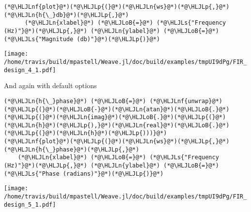 \documentclass[12pt,a4paper]{article}
\newcommand{\HLJLn}[1]{#1}
\newcommand{\HLJLnf}[1]{\textcolor[RGB]{66,102,213}{#1}}
\newcommand{\HLJLs}[1]{\textcolor[RGB]{201,61,57}{#1}}
\newcommand{\HLJLoB}[1]{\textcolor[RGB]{102,102,102}{\textbf{#1}}}
\newcommand{\HLJLp}[1]{#1}
\begin{document}
\begin{lstlisting}
(*@\HLJLnf{plot}@*)(*@\HLJLp{(}@*)(*@\HLJLn{ws}@*)(*@\HLJLp{,}@*) (*@\HLJLn{h{\_}db}@*)(*@\HLJLp{,}@*)
      (*@\HLJLn{xlabel}@*) (*@\HLJLoB{=}@*) (*@\HLJLs{"Frequency (Hz)"}@*)(*@\HLJLp{,}@*) (*@\HLJLn{ylabel}@*) (*@\HLJLoB{=}@*) (*@\HLJLs{"Magnitude (db)"}@*)(*@\HLJLp{)}@*)
\end{lstlisting}

\texttt{[image: /home/travis/build/mpastell/Weave.jl/doc/build/examples/tmpUI9dPg/FIR\_design\_4\_1.pdf]}

And again with default options


\begin{lstlisting}
(*@\HLJLn{h{\_}phase}@*) (*@\HLJLoB{=}@*) (*@\HLJLnf{unwrap}@*)(*@\HLJLp{(}@*)(*@\HLJLoB{-}@*)(*@\HLJLn{atan}@*)(*@\HLJLoB{.}@*)(*@\HLJLp{(}@*)(*@\HLJLn{imag}@*)(*@\HLJLoB{.}@*)(*@\HLJLp{(}@*)(*@\HLJLn{h}@*)(*@\HLJLp{),}@*)(*@\HLJLn{real}@*)(*@\HLJLoB{.}@*)(*@\HLJLp{(}@*)(*@\HLJLn{h}@*)(*@\HLJLp{)))}@*)
(*@\HLJLnf{plot}@*)(*@\HLJLp{(}@*)(*@\HLJLn{ws}@*)(*@\HLJLp{,}@*) (*@\HLJLn{h{\_}phase}@*)(*@\HLJLp{,}@*)
    (*@\HLJLn{xlabel}@*) (*@\HLJLoB{=}@*) (*@\HLJLs{"Frequency (Hz)"}@*)(*@\HLJLp{,}@*) (*@\HLJLn{ylabel}@*) (*@\HLJLoB{=}@*) (*@\HLJLs{"Phase (radians)"}@*)(*@\HLJLp{)}@*)
\end{lstlisting}

\texttt{[image: /home/travis/build/mpastell/Weave.jl/doc/build/examples/tmpUI9dPg/FIR\_design\_5\_1.pdf]}
\end{document}

